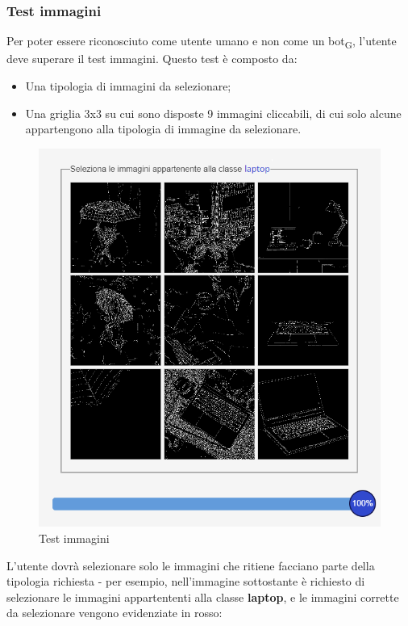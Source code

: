 \subsubsection{Test immagini}
Per poter essere riconosciuto come utente umano e non come un bot\textsubscript{G}, l'utente deve superare il test immagini. Questo test è composto da:
\begin{itemize}
    \item Una tipologia di immagini da selezionare;
	\item Una griglia 3x3 su cui sono disposte 9 immagini cliccabili, di cui solo alcune appartengono alla tipologia di immagine da selezionare.
\end{itemize} 

\begin{figure}[H]
    \centering
    \includegraphics[scale=0.6]{src/img/computerlaptop.png}
    \caption{Test immagini}
\end{figure}

\newpage
 
L'utente dovrà selezionare solo le immagini che ritiene facciano parte della tipologia richiesta - per esempio, nell'immagine sottostante è richiesto di selezionare le immagini appartententi alla classe \textbf{laptop}, e le immagini corrette da selezionare vengono evidenziate in rosso:

